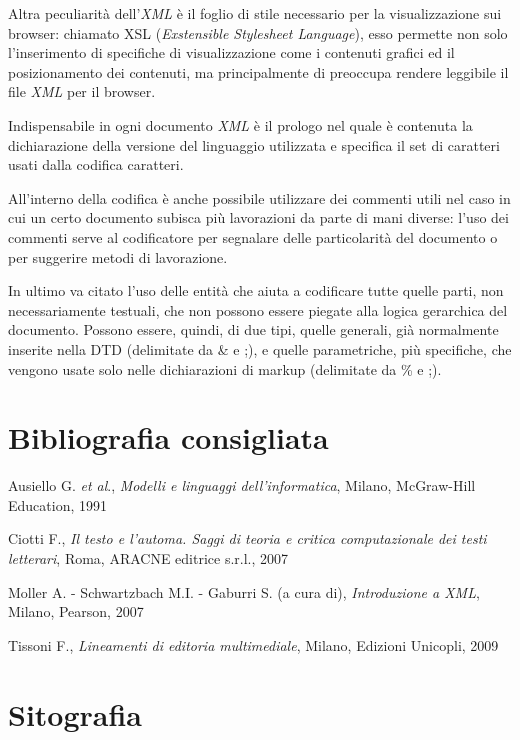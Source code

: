 \documentclass[
  b5paper,
  twoside,
  12pt,
  chapterprefix=false,
  bibliography=totocnumbered,
  parskip=false]{scrbook}
\begin{document}
Altra peculiarità dell'\emph{XML} è il foglio di stile necessario per la
visualizzazione sui browser: chiamato XSL (\emph{Exstensible Stylesheet
Language}), esso permette non solo l'inserimento di specifiche di
visualizzazione come i contenuti grafici ed il posizionamento dei
contenuti, ma principalmente di preoccupa rendere leggibile il file
\emph{XML} per il browser.

Indispensabile in ogni documento \emph{XML} è il prologo nel quale è
contenuta la dichiarazione della versione del linguaggio utilizzata e
specifica il set di caratteri usati dalla codifica caratteri.

All'interno della codifica è anche possibile utilizzare dei commenti
utili nel caso in cui un certo documento subisca più lavorazioni da
parte di mani diverse: l'uso dei commenti serve al codificatore per
segnalare delle particolarità del documento o per suggerire metodi di
lavorazione.

In ultimo va citato l'uso delle entità che aiuta a codificare tutte
quelle parti, non necessariamente testuali, che non possono essere
piegate alla logica gerarchica del documento. Possono essere, quindi, di
due tipi, quelle generali, già normalmente inserite nella DTD
(delimitate da \& e ;), e quelle parametriche, più specifiche, che
vengono usate solo nelle dichiarazioni di markup (delimitate da \% e ;).

\hypertarget{bibliografia-consigliata-28}{%
\section*{Bibliografia consigliata}\label{bibliografia-consigliata-28}}

Ausiello G. \emph{et al}., \emph{Modelli e linguaggi dell'informatica}, Milano,
McGraw-Hill Education, 1991

Ciotti F., \emph{Il testo e l'automa. Saggi di teoria e critica
computazionale dei testi letterari}, Roma, ARACNE editrice s.r.l., 2007

Moller A. - Schwartzbach M.I. - Gaburri S. (a cura di), \emph{Introduzione a
XML}, Milano, Pearson, 2007

Tissoni F., \emph{Lineamenti di editoria multimediale}, Milano, Edizioni
Unicopli, 2009

\hypertarget{sitografia-36}{%
\section*{Sitografia}\label{sitografia-36}}
\end{document}

